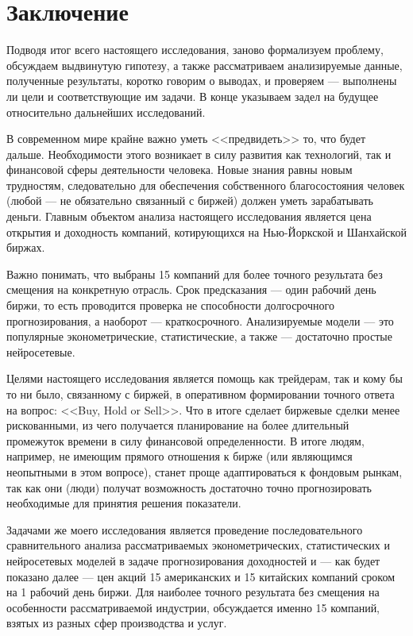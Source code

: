 \section{Заключение}
Подводя итог всего настоящего исследования, заново формализуем проблему, обсуждаем выдвинутую гипотезу, а также рассматриваем анализируемые данные, полученные результаты, коротко говорим о выводах, и проверяем --- выполнены ли цели и соответствующие им задачи. В конце указываем задел на будущее относительно дальнейших исследований.

В современном мире крайне важно уметь <<предвидеть>> то, что будет дальше. Необходимости этого возникает в силу развития как технологий, так и финансовой сферы деятельности человека. Новые знания равны новым трудностям, следовательно для обеспечения собственного благосостояния человек (любой --- не обязательно связанный с биржей) должен уметь зарабатывать деньги. Главным объектом анализа настоящего исследования является цена открытия и доходность компаний, котирующихся на Нью-Йоркской и Шанхайской биржах.

Важно понимать, что выбраны 15 компаний для более точного результата без смещения на конкретную отрасль. Срок предсказания --- один рабочий день биржи, то есть проводится проверка не способности долгосрочного прогнозирования, а наоборот --- краткосрочного. Анализируемые модели --- это популярные эконометрические, статистические, а также --- достаточно простые нейросетевые.

Целями настоящего исследования является помощь как трейдерам, так и кому бы то ни было, связанному с биржей, в оперативном формировании точного ответа на вопрос: <<Buy, Hold or Sell>>. Что в итоге сделает биржевые сделки менее рискованными, из чего получается планирование на более длительный промежуток времени в силу финансовой определенности. В итоге людям, например, не имеющим прямого отношения к бирже (или являющимся неопытными в этом вопросе), станет проще адаптироваться к фондовым рынкам, так как они (люди) получат возможность достаточно точно прогнозировать необходимые для принятия решения показатели.

Задачами же моего исследования является проведение последовательного сравнительного анализа рассматриваемых эконометрических, статистических и нейросетевых моделей в задаче прогнозирования доходностей и --- как будет показано далее --- цен акций 15 американских и 15 китайских компаний сроком на 1 рабочий день биржи. Для наиболее точного результата без смещения на особенности рассматриваемой индустрии, обсуждается именно 15 компаний, взятых из разных сфер производства и услуг.

